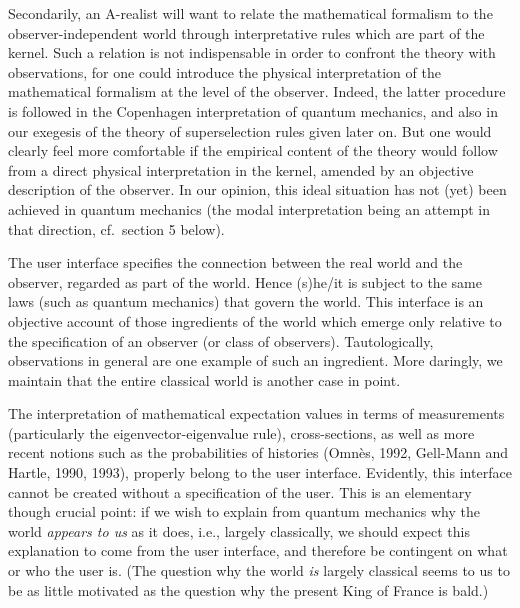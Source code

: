 \documentclass[12pt,titlepage]{article}
\begin{document}
Secondarily, an A-realist will want to relate the mathematical formalism to the
observer-independent
world through interpretative rules which are part of the kernel. Such a
relation is  not
indispensable in order to confront the theory with observations, for one could
introduce the physical
interpretation of the mathematical formalism  at the level of the observer.
Indeed, the latter procedure is followed in the Copenhagen interpretation of
quantum mechanics, and
also in our exegesis of the theory of superselection rules given later on.
 But one would  clearly feel more comfortable if the empirical
content of the theory would follow from  a direct physical interpretation in
the kernel, amended by an
objective description of the observer. In our opinion, this ideal situation has
not (yet) been
achieved in quantum mechanics (the modal interpretation being an attempt in
that direction, cf.\
section 5 below).

The user interface specifies the connection between the real world and the
observer, regarded
as part of the world. Hence  (s)he/it is subject to the same laws (such as
quantum mechanics)
that govern the world. This interface is an objective account of those
ingredients of the world
which emerge only relative to the specification of an observer (or class of
observers).
Tautologically, observations in general are one example of such an ingredient.
More daringly,
we maintain that the entire classical world is another case in point.

The interpretation of mathematical expectation values in terms of measurements
(particularly the
eigenvector-eigenvalue rule), cross-sections, as well as more recent notions
such as the
probabilities of histories (Omn\`{e}s, 1992, Gell-Mann and Hartle, 1990, 1993),
properly belong to the
user interface. Evidently,  this interface cannot be created without a
specification of the user.
This is an elementary though crucial point: if we wish to explain from quantum
mechanics why the
world {\em appears to us} as it does, i.e., largely  classically, we should
expect this explanation
to come from the user interface, and therefore be contingent on what or who the
user is. (The
question why the world {\em is} largely classical seems to us to be as little
motivated as the
question why the present King of France is bald.)
\end{document}
